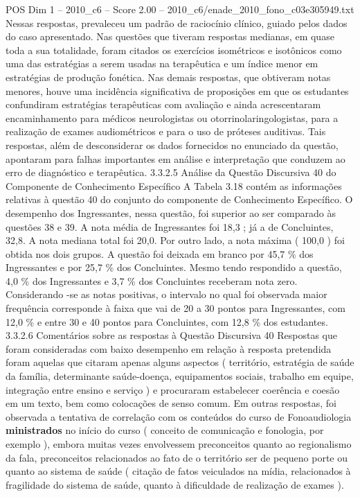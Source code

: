 \begin{textsample}{POS Dim 1 – 2010\_c6 – Score 2.00 – 2010\_c6/enade\_2010\_fono\_c03e305949.txt}
Nessas respostas, prevaleceu um padrão de raciocínio clínico, guiado pelos dados do caso apresentado.
Nas questões que tiveram respostas medianas, em quase toda a sua totalidade, foram citados os exercícios isométricos e isotônicos como uma das estratégias a serem usadas na terapêutica e um índice menor em estratégias de produção fonética.
Nas demais respostas, que obtiveram notas menores, houve uma incidência significativa de proposições em que os estudantes confundiram estratégias terapêuticas com avaliação e ainda acrescentaram encaminhamento para médicos neurologistas ou otorrinolaringologistas, para a realização de exames audiométricos e para o uso de próteses auditivas.
Tais respostas, além de desconsiderar os dados fornecidos no enunciado da questão, apontaram para falhas importantes em análise e interpretação que conduzem ao erro de diagnóstico e terapêutica. 3.3.2.5 Análise da Questão Discursiva 40 do Componente de Conhecimento Específico A Tabela 3.18 contém as informações relativas à questão 40 do conjunto do componente de Conhecimento Específico.
O desempenho dos Ingressantes, nessa questão, foi superior ao ser comparado às questões 38 e 39.
A nota média de Ingressantes foi 18,3 ; já a de Concluintes, 32,8.
A nota mediana total foi 20,0.
Por outro lado, a nota máxima ( 100,0 ) foi obtida nos dois grupos.
A questão foi deixada em branco por 45,7 \% dos Ingressantes e por 25,7 \% dos Concluintes.
Mesmo tendo respondido a questão, 4,0 \% dos Ingressantes e 3,7 \% dos Concluintes receberam nota zero.
Considerando -se as notas positivas, o intervalo no qual foi observada maior frequência corresponde à faixa que vai de 20 a 30 pontos para Ingressantes, com 12,0 \% e entre 30 e 40 pontos para Concluintes, com 12,8 \% dos estudantes. 3.3.2.6 Comentários sobre as respostas à Questão Discursiva 40 Respostas que foram consideradas com baixo desempenho em relação à resposta pretendida foram aquelas que citaram apenas alguns aspectos ( território, estratégia de saúde da família, determinante saúde-doença, equipamentos sociais, trabalho em equipe, integração entre ensino e serviço ) e procuraram estabelecer coerência e coesão em um texto, bem como colocações de senso comum.
Em outras respostas, foi observada a tentativa de correlação com os conteúdos do curso de Fonoaudiologia \textbf{ministrados} no início do curso ( conceito de comunicação e fonologia, por exemplo ), embora muitas vezes envolvessem preconceitos quanto ao regionalismo da fala, preconceitos relacionados ao fato de o território ser de pequeno porte ou quanto ao sistema de saúde ( citação de fatos veiculados na mídia, relacionados à fragilidade do sistema de saúde, quanto à dificuldade de realização de exames ).

\end{textsample}
